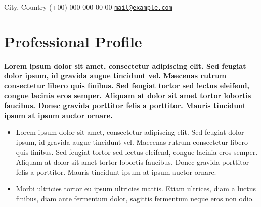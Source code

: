 \documentclass[overlapped,line,final]{res}
\begin{document}

\begin{resume}


	\begin{minipage}{0.5\linewidth}
    		City, Country \newline
    		(+00) 000 000 00 00 \newline
		{\tt \href{mailto:mail@example.com}{mail@example.com}}
	\end{minipage}
\vspace{0.5cm}
\section{\sc Professional Profile}
\vspace{0.5cm}

	\textbf {Lorem ipsum dolor sit amet, consectetur adipiscing elit. Sed feugiat dolor ipsum, id gravida augue tincidunt vel. Maecenas rutrum consectetur libero quis finibus. Sed feugiat tortor sed lectus eleifend, congue lacinia eros semper. Aliquam at dolor sit amet tortor lobortis faucibus. Donec gravida porttitor felis a porttitor. Mauris tincidunt ipsum at ipsum auctor ornare. }

\vspace{2mm}
\begin{itemize} 
    \item Lorem ipsum dolor sit amet, consectetur adipiscing elit. Sed feugiat dolor ipsum, id gravida augue tincidunt vel. Maecenas rutrum consectetur libero quis finibus. Sed feugiat tortor sed lectus eleifend, congue lacinia eros semper. Aliquam at dolor sit amet tortor lobortis faucibus. Donec gravida porttitor felis a porttitor. Mauris tincidunt ipsum at ipsum auctor ornare.  
    \item Morbi ultricies tortor eu ipsum ultricies mattis. Etiam ultrices, diam a luctus finibus, diam ante fermentum dolor, sagittis fermentum neque eros non odio. 
\end{itemize}

\vspace{0.5cm}

\end{resume}
\end{document}
